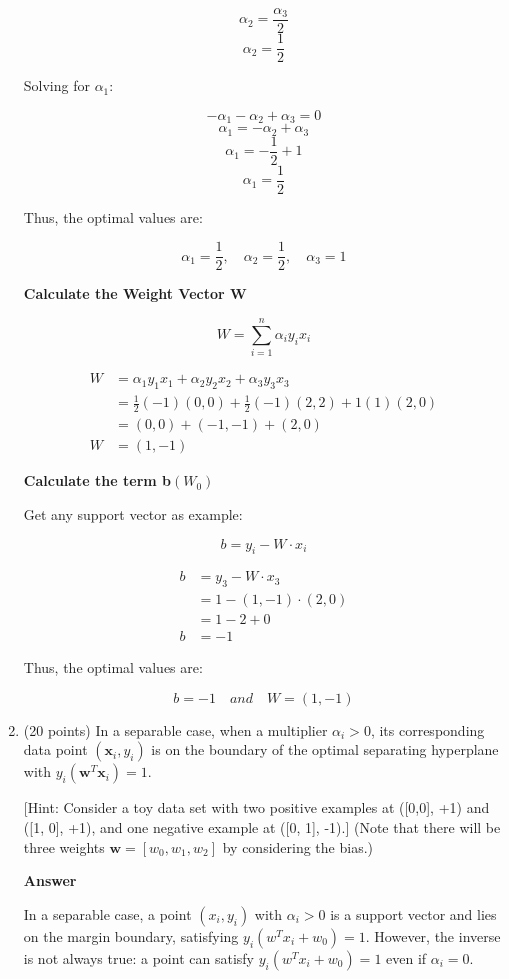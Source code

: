 \documentclass[11pt]{article}
\begin{document}
\begin{enumerate}
\[\alpha_2 = \frac{\alpha_3}{2}\]
\[\alpha_2 = \frac{1}{2}\]

Solving for \(\alpha_1\):

\[-\alpha_1 - \alpha_2 + \alpha_3 = 0\]
\[\alpha_1 = - \alpha_2 + \alpha_3\]
\[\alpha_1 = - \frac{1}{2} + 1\]
\[\alpha_1 = \frac{1}{2}\]

Thus, the optimal values are:

\[
\alpha_1 = \frac{1}{2}, \quad \alpha_2 = \frac{1}{2}, \quad \alpha_3 = 1
\]

\textbf{Calculate the Weight Vector W}

\[W = \sum^n_{i=1} \alpha_iy_ix_i\]

\[\begin{aligned}
    W &= \alpha_1y_1x_1 + \alpha_2y_2x_2 + \alpha_3y_3x_3 \\[5pt]
    &= \frac{1}{2}(-1)(0,0)+\frac{1}{2}(-1)(2,2)+1(1)(2,0) \\[5pt]
    &=(0,0)+(-1,-1)+(2,0) \\[5pt]
    W &= (1,-1)
\end{aligned}\]

\textbf{Calculate the term b}$(W_0)$

Get any support vector as example:

\[b = y_i - W \cdot x_i\]

\[\begin{aligned}
    b&=y_3 - W \cdot x_3\\[5pt]
    &=1-(1,-1)\cdot(2,0) \\[5pt]
    &=1-2+0 \\[5pt]
    b&=-1
\end{aligned}\]

Thus, the optimal values are:

\[
b=-1 \quad and \quad W = (1, -1)
\]

\item (20 points) In a separable case, when a multiplier
$\alpha_i > 0$, its corresponding data point $(\boldsymbol x_i,
y_i)$ is on the boundary of the optimal separating hyperplane
with $y_i(\boldsymbol w^T \boldsymbol x_i) = 1$.

[Hint: Consider a toy data set with two positive examples at
([0,0], +1) and ([1, 0], +1), and one negative example at ([0,
1], -1).] (Note that there will be three weights $\boldsymbol w =
[w_0, w_1, w_2]$ by considering the bias.)

\textbf{Answer}

In a separable case, a point \( (x_i, y_i) \) with \( \alpha_i > 0 \) is a support vector and lies on the margin boundary, satisfying \( y_i(w^T x_i + w_0) = 1 \). However, the inverse is not always true: a point can satisfy \( y_i(w^T x_i + w_0) = 1 \) even if \( \alpha_i = 0 \).


\end{enumerate}
\end{document}

